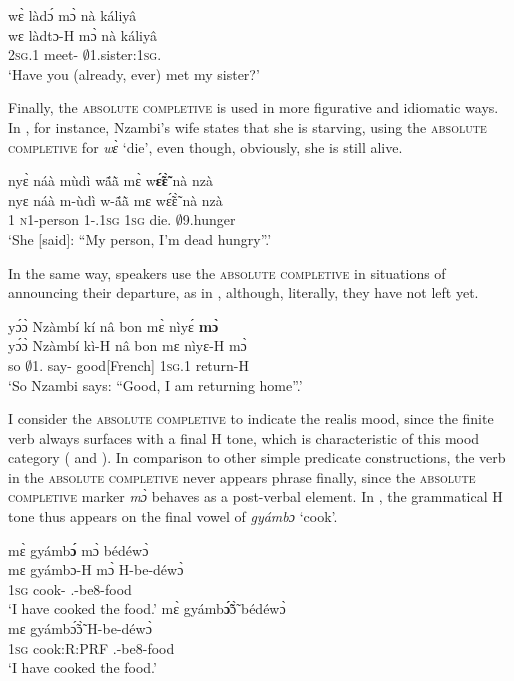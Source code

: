 \ea\label{mo7}
  \glll     wɛ̀  làdɔ́ mɔ̀ nà káliyâ \\
          wɛ  làdtɔ-H mɔ̀ nà káliyâ \\
           2\textsc{sg}.{\PST}1  meet-{\R} {\COMPL} {\COM} $\emptyset$1.sister:1\textsc{sg}.{\POSS}  \\
    \trans `Have you (already, ever) met my sister?'
\z

Finally, the \textsc{absolute completive} is used in more figurative and idiomatic ways. In , for instance, Nzambi's wife states that she is starving, using the \textsc{absolute completive} for {\itshape wɛ̀} `die', even though, obviously, she is still alive.

\ea\label{mo8}
  \glll  nyɛ̀ náà mùdì wã́ã̀ mɛ̀ w{\bfseries ɛ̃́ɛ̃̀} nà nzà \\
         nyɛ náà m-ùdì w-ã́ã̀ mɛ wɛ̃́ɛ̃̀ nà nzà\\
           1 {\COMP} \textsc{n}1-person 1-{\POSS}.1\textsc{sg} 1\textsc{sg} die.{\COMPL} {\COM} $\emptyset$9.hunger\\
    \trans `She [said]: ``My person, I'm dead hungry''.' 
\z

\noindent In the same way, speakers use the \textsc{absolute completive} in situations of announcing their departure, as in , although, literally, they have not left yet.

\ea\label{mo9}
  \glll yɔ́ɔ̀ Nzàmbí kí nâ bon mɛ̀ nìyɛ́ {\bfseries mɔ̀} \\
        yɔ́ɔ̀ Nzàmbí kì-H nâ bon mɛ nìyɛ-H mɔ̀ \\
        so $\emptyset$1.{\PN} say-{\R} {\COMP} good[French] 1\textsc{sg}.{\PST}1 return-H {\COMPL} \\
    \trans `So Nzambi says: ``Good, I am returning home''.'
\z



I consider the \textsc{absolute completive} to indicate the realis mood, since the finite verb always surfaces with a final H tone, which is characteristic of this mood category ( and ). In comparison to other simple predicate constructions, the verb in the \textsc{absolute completive} never appears phrase finally, since the \textsc{absolute completive} marker {\itshape mɔ̀} behaves as a post-verbal element.  In , the grammatical H tone thus appears on the final vowel of {\itshape gyámbɔ} `cook'.

\ea\label{PROGtoneA}
\ea \label{PROGtone1A}
  \glll     mɛ̀ gyámb{\bfseries ɔ́} mɔ̀ bédéwɔ̀ \\
           mɛ gyámbɔ-H mɔ̀ H-be-déwɔ̀ \\
            1\textsc{sg} cook-{\R} {\COMPL} {\OBJ}.{\LINK}-be8-food\\
    \trans `I have cooked the food.'
\ex \label{PROGtone2A}
  \glll  mɛ̀ gyámb{\bfseries ɔ̃́}ɔ̃̀ bédéwɔ̀ \\
            mɛ gyámbɔ̃́ɔ̃̀ H-be-déwɔ̀ \\
             1\textsc{sg} cook:R:PRF {\OBJ}.{\LINK}-be8-food\\
    \trans `I have cooked the food.'
\z
\z

